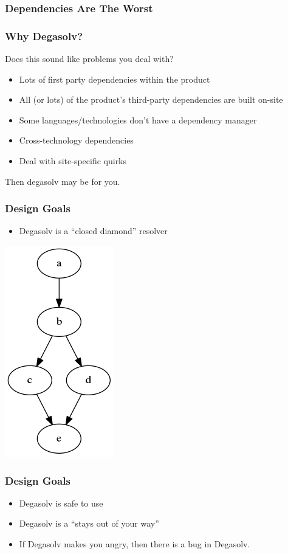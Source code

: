 \documentclass{beamer}
\begin{document}
\begin{frame}[fragile]
  \frametitle{Dependencies Are The Worst}

\end{frame}
\begin{frame}
  \frametitle{Why Degasolv?}
  
  Does this sound like problems you deal with?
  
  \break
  
  \begin{itemize}
  \item Lots of first party dependencies within the product
  \item All (or lots) of the product's third-party dependencies are built on-site
  \item Some languages/technologies don't have a dependency manager
  \item Cross-technology dependencies
  \item Deal with site-specific quirks
  \end{itemize}
  
  \break
  
  Then degasolv may be for you.
  
\end{frame}
\begin{frame}
  \frametitle{Design Goals}
  \begin{itemize}
    \item Degasolv is a ``closed diamond'' resolver
  \end{itemize}
  \centerline{\includegraphics[scale=0.5]{diamonddep.png}}
\end{frame}
\begin{frame}
  \frametitle{Design Goals}
  \begin{itemize}
  \item Degasolv is safe to use
  \item Degasolv is a ``stays out of your way''
  \item If Degasolv makes you angry, then there is a bug in Degasolv.
  \end{itemize}
\end{frame}
\end{document}
